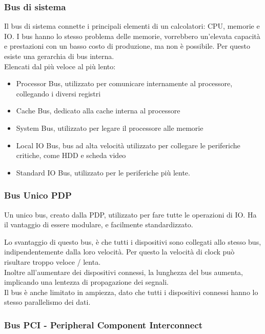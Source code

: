 \documentclass[../template]{subfiles}
\begin{document}
\subsubsection{Bus di sistema}
Il bus di sistema connette i principali elementi di un calcolatori: CPU, memorie e IO.
I bus hanno lo stesso problema delle memorie, vorrebbero un'elevata capacità e prestazioni con un basso costo di produzione, ma non è possibile. Per questo esiste una gerarchia di bus interna.
\\
Elencati dal più veloce al più lento:
\begin{itemize}
    \item Processor Bus, utilizzato per comunicare internamente al processore, collegando i diversi registri
    \item Cache Bus, dedicato alla cache interna al processore
    \item System Bus, utilizzato per legare il processore alle memorie
    \item Local IO Bus, bus ad alta velocità utilizzato per collegare le periferiche critiche, come HDD e scheda video
    \item Standard IO Bus, utilizzato per le periferiche più lente.
\end{itemize}

\subsubsection{Bus Unico PDP}
Un unico bus, creato dalla PDP, utilizzato per fare tutte le operazioni di IO. Ha il vantaggio di essere modulare, e facilmente standardizzato.

Lo svantaggio di questo bus, è che tutti i dispositivi sono collegati allo stesso bus, indipendentemente dalla loro velocità.
Per questo la velocità di clock può risultare troppo veloce / lenta.
\\
Inoltre all'aumentare dei dispositivi connessi, la lunghezza del bus aumenta, implicando una lentezza di propagazione dei segnali.
\\
Il bus è anche limitato in ampiezza, dato che tutti i dispositivi connessi hanno lo stesso parallelismo dei dati.

\subsubsection{Bus PCI - Peripheral Component Interconnect}
\end{document}
